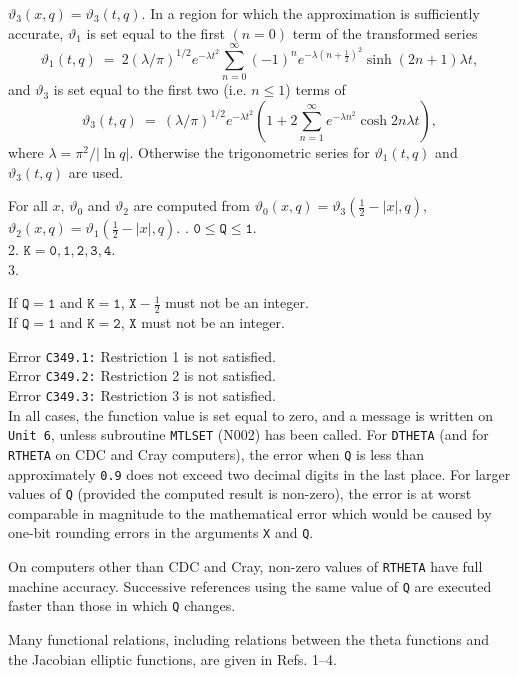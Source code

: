 $\vartheta_3(x,q)=\vartheta_3(t,q)$. In a region for which the
approximation is sufficiently accurate, $\vartheta_1$ is set equal to
the first $(n=0)$ term of the transformed series
$$ \vartheta_1(t,q) \ = \ 2(\lambda/\pi)^{1/2} e^{-\lambda t^2}
\displaystyle \sum_{n=0}^\infty (-1)^n e^{-\lambda(n+\frac{1}{2})^2}
\sinh (2n+1)\lambda t, $$
and $\vartheta_3$ is set equal to the first two (i.e. $n \le 1$)
terms of
$$ \vartheta_3(t,q) \ = \ (\lambda/\pi)^{1/2} e^{-\lambda t^2}
\displaystyle \left( 1+2 \sum_{n=1}^\infty
e^{-\lambda n^2} \cosh 2n\lambda t \right), $$
where $\lambda = \pi^2/|\ln q|$. Otherwise the trigonometric series
for $\vartheta_1(t,q)$ and $\vartheta_3(t,q)$ are used.
\par
For all $x$, $\vartheta_0$ and $\vartheta_2$ are computed from
$\vartheta_0(x,q)=\vartheta_3(\frac{1}{2}-|x|,q)$,
$\vartheta_2(x,q)=\vartheta_1(\frac{1}{2}-|x|,q)$.
. \quad $\mathtt{0 \le Q \le 1}$. \\
2. \quad $\mathtt{K = 0,1,2,3,4}$. \\
3. \quad \parbox[t]{90mm}{If $\mathtt{Q = 1}$ and $\mathtt{K = 1}$,
$\mathtt{X-}\frac{1}{2}$ must not be an integer. \\
If $\mathtt{Q = 1}$ and $\mathtt{K = 2}$,
$\mathtt{X}$ must not be an integer.}
\Errorh
Error {\tt C349.1:} Restriction 1 is not satisfied. \\
Error {\tt C349.2:} Restriction 2 is not satisfied. \\
Error {\tt C349.3:} Restriction 3 is not satisfied. \\
In all cases, the function value is set equal to zero, and a message
is written on {\tt Unit 6}, unless subroutine {\tt MTLSET} (N002)
has been called.
\Accuracy
For {\tt DTHETA} (and for {\tt RTHETA} on CDC and Cray computers),
the error when {\tt Q} is less than approximately {\tt 0.9} does not
exceed two decimal digits in the last place. For larger values of
{\tt Q} (provided the computed result is non-zero), the error is at
worst comparable in magnitude to the mathematical error which would be
caused by one-bit rounding errors in the arguments {\tt X} and {\tt Q}.
\par
On computers other than CDC and Cray, non-zero values of {\tt RTHETA}
have full machine accuracy.
\Notes
Successive references using the same value of {\tt Q} are executed
faster than those in which {\tt Q} changes.
\par
Many functional relations, including relations between the theta
functions and the Jacobian elliptic functions, are given in Refs. 1--4.
